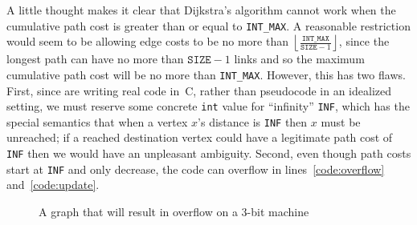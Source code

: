 A little thought makes it clear that Dijkstra's algorithm cannot work when the cumulative path
cost is greater than or equal to \texttt{INT\_MAX}.  A reasonable restriction would seem to be
allowing edge costs to be no more than $\left\lfloor\frac{\texttt{INT\_MAX}}{\texttt{SIZE}-1}\right\rfloor$, since the longest path can have no more than $\texttt{SIZE}-1$ links and so the maximum cumulative path cost will be no more than \texttt{INT\_MAX}.  However, this has two flaws.  First, since are writing real code in~C, rather than pseudocode in an idealized setting, we must reserve some concrete \texttt{int} value for ``infinity'' \texttt{INF}, which has the special semantics that when a vertex $x$'s distance is \texttt{INF} then $x$ must be unreached; if a reached destination vertex could have a legitimate path cost of \texttt{INF} then we would have an unpleasant ambiguity.  Second, even though path costs start at \texttt{INF} and only decrease, the code can overflow in lines~\ref{code:overflow} and~\ref{code:update}.

\begin{figure}[t]
\centering
{}
\caption{A graph that will result in overflow on a 3-bit machine}
\label{fig:overflow}
\end{figure}

